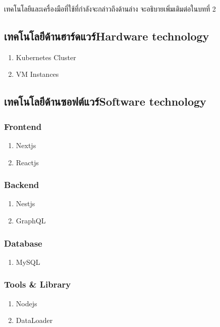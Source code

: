 เทคโนโลยีและเครื่องมือที่ใช้ที่กำลังจะกล่าวถึงด้านล่าง จะอธิบายเพิ่มเติมต่อในบทที่ 2

\subsection{\ifcpe เทคโนโลยีด้านฮาร์ดแวร์\else Hardware technology\fi}
\begin{enumerate}
    \item Kubernetes Cluster
    \item VM Instances
\end{enumerate}

\subsection{\ifcpe เทคโนโลยีด้านซอฟต์แวร์\else Software technology\fi}
\subsubsection{Frontend}
\begin{enumerate}
    \item Nextjs \cite{nextjs}
    \item Reactjs \cite{reactjs}
\end{enumerate}

\subsubsection{Backend}
\begin{enumerate}
    \item Nestjs \cite {nestjs}
    \item GraphQL \cite {graphql}
\end{enumerate}

\subsubsection{Database}
\begin{enumerate}
    \item MySQL \cite {mysql}
\end{enumerate}

\subsubsection{Tools \& Library}
\begin{enumerate}
    \item Nodejs \cite {nodejs}
    \item DataLoader \cite {dataloader}
\end{enumerate}

